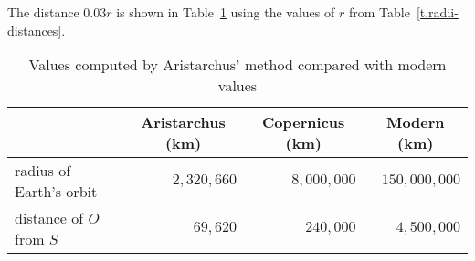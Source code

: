 The distance $0.03r$ is shown in Table~\ref{t.orbit-distance} using the values of $r$ from Table~\ref{t.radii-distances}.

\begin{table}[h]
\begin{center}
\begin{tabular}{|l|r|r|r|}
\hline
&\multicolumn{1}{|c|}{Aristarchus (km)}&
\multicolumn{1}{|c|}{Copernicus (km)} & \multicolumn{1}{|c|}{Modern (km)}\\
\hline\hline
radius of Earth's orbit & $2,320,660$ & $8,000,000$ & $150,000,000$\\\hline
distance of $O$ from $S$ & $69,620$ & $240,000$ & $4,500,000$ \\
\hline
\end{tabular}
\caption{Values computed by Aristarchus' method compared with modern values}
\label{t.orbit-distance}
\end{center}
\end{table}